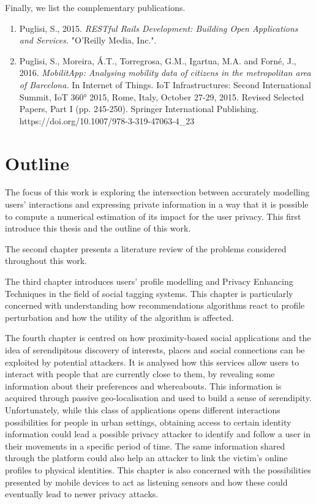 Finally, we list the complementary publications.

\begin{enumerate}
    \item Puglisi, S., 2015. \emph{RESTful Rails Development: Building Open Applications and Services.} "O'Reilly Media, Inc.". 
    
    \item Puglisi, S., Moreira, \'A.T., Torregrosa, G.M., Igartua, M.A. and Forn\'e, J., 2016. \emph{MobilitApp: Analysing mobility data of citizens in the metropolitan area of Barcelona.} In Internet of Things. IoT Infrastructures: Second International Summit, IoT 360° 2015, Rome, Italy, October 27-29, 2015. Revised Selected Papers, Part I (pp. 245-250). Springer International Publishing. https://doi.org/10.1007/978-3-319-47063-4\_23
\end{enumerate}

\section{Outline}

The focus of this work is exploring the intersection between accurately modelling users' interactions and expressing private information in a way that it is possible to compute a numerical estimation of its impact for the user privacy. This first introduce this thesis and the outline of this work.

The second chapter presents a literature review of the problems considered throughout this work.

The third chapter introduces users' profile modelling and Privacy Enhancing Techniques in the field of social tagging systems. This chapter is particularly concerned with understanding how recommendations algorithms react to profile perturbation and how the utility of the algorithm is affected.

The fourth chapter is centred on how proximity-based social applications and the idea of serendipitous discovery of interests, places and social connections can be exploited by potential attackers. It is analysed how this services allow users to interact with people that are currently close to them, by revealing some information about their preferences and whereabouts. This information is acquired through passive geo-localisation and used to build a sense of serendipity. Unfortunately, while this class of applications opens different interactions possibilities for people in urban settings, obtaining access to certain identity information could lead a possible privacy attacker to identify and follow a user in their movements in a specific period of time. The same information shared through the platform could also help an attacker to link the victim’s online profiles to physical identities. This chapter is also concerned with the possibilities presented by mobile devices to act as listening sensors and how these could eventually lead to newer privacy attacks.

